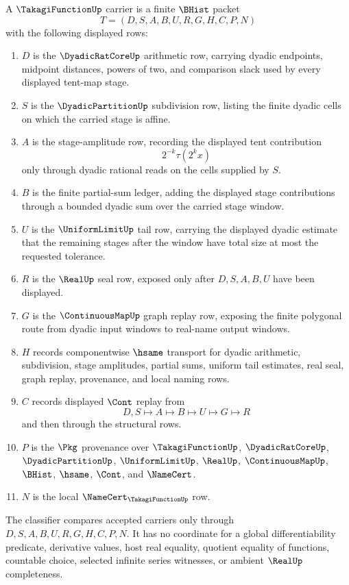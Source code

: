 \begin{definition}
\label{def:takagi-function-carrier}
A $\TakagiFunctionUp$ carrier is a finite $\BHist$ packet
$$
T=(D,S,A,B,U,R,G,H,C,P,N)
$$
with the following displayed rows:
\begin{enumerate}
\item $D$ is the $\DyadicRatCoreUp$ arithmetic row, carrying dyadic endpoints, midpoint distances, powers of two, and comparison slack used by every displayed tent-map stage.
\item $S$ is the $\DyadicPartitionUp$ subdivision row, listing the finite dyadic cells on which the carried stage is affine.
\item $A$ is the stage-amplitude row, recording the displayed tent contribution
$$
2^{-k}\tau(2^k x)
$$
only through dyadic rational reads on the cells supplied by $S$.
\item $B$ is the finite partial-sum ledger, adding the displayed stage contributions through a bounded dyadic sum over the carried stage window.
\item $U$ is the $\UniformLimitUp$ tail row, carrying the displayed dyadic estimate that the remaining stages after the window have total size at most the requested tolerance.
\item $R$ is the $\RealUp$ seal row, exposed only after $D,S,A,B,U$ have been displayed.
\item $G$ is the $\ContinuousMapUp$ graph replay row, exposing the finite polygonal route from dyadic input windows to real-name output windows.
\item $H$ records componentwise $\hsame$ transport for dyadic arithmetic, subdivision, stage amplitudes, partial sums, uniform tail estimates, real seal, graph replay, provenance, and local naming rows.
\item $C$ records displayed $\Cont$ replay from
$$
D,S \longmapsto A \longmapsto B \longmapsto U \longmapsto G \longmapsto R
$$
and then through the structural rows.
\item $P$ is the $\Pkg$ provenance over $\TakagiFunctionUp$, $\DyadicRatCoreUp$, $\DyadicPartitionUp$, $\UniformLimitUp$, $\RealUp$, $\ContinuousMapUp$, $\BHist$, $\hsame$, $\Cont$, and $\NameCert$.
\item $N$ is the local $\NameCert_{\TakagiFunctionUp}$ row.
\end{enumerate}
The classifier compares accepted carriers only through $D,S,A,B,U,R,G,H,C,P,N$. It has no coordinate for a global differentiability predicate, derivative values, host real equality, quotient equality of functions, countable choice, selected infinite series witnesses, or ambient $\RealUp$ completeness.
\end{definition}

